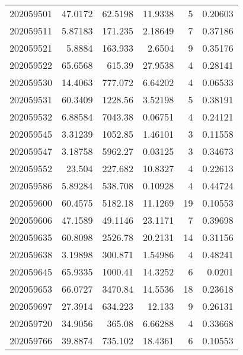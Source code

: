 \begin{tabular}{rrrrrr}
 202059501 &         47.0172  &       62.5198 &           11.9338  &           5 & 0.20603 \\
 202059511 &          5.87183 &      171.235  &            2.18649 &           7 & 0.37186 \\
 202059521 &          5.8884  &      163.933  &            2.6504  &           9 & 0.35176 \\
 202059522 &         65.6568  &      615.39   &           27.9538  &           4 & 0.28141 \\
 202059530 &         14.4063  &      777.072  &            6.64202 &           4 & 0.06533 \\
 202059531 &         60.3409  &     1228.56   &            3.52198 &           5 & 0.38191 \\
 202059532 &          6.88584 &     7043.38   &            0.06751 &           4 & 0.24121 \\
 202059545 &          3.31239 &     1052.85   &            1.46101 &           3 & 0.11558 \\
 202059547 &          3.18758 &     5962.27   &            0.03125 &           3 & 0.34673 \\
 202059552 &         23.504   &      227.682  &           10.8327  &           4 & 0.22613 \\
 202059586 &          5.89284 &      538.708  &            0.10928 &           4 & 0.44724 \\
 202059600 &         60.4575  &     5182.18   &           11.1269  &          19 & 0.10553 \\
 202059606 &         47.1589  &       49.1146 &           23.1171  &           7 & 0.39698 \\
 202059635 &         60.8098  &     2526.78   &           20.2131  &          14 & 0.31156 \\
 202059638 &          3.19898 &      300.871  &            1.54986 &           4 & 0.48241 \\
 202059645 &         65.9335  &     1000.41   &           14.3252  &           6 & 0.0201  \\
 202059653 &         66.0727  &     3470.84   &           14.5536  &          18 & 0.23618 \\
 202059697 &         27.3914  &      634.223  &           12.133   &           9 & 0.26131 \\
 202059720 &         34.9056  &      365.08   &            6.66288 &           4 & 0.33668 \\
 202059766 &         39.8874  &      735.102  &           18.4361  &           6 & 0.10553 \\

\end{tabular}
